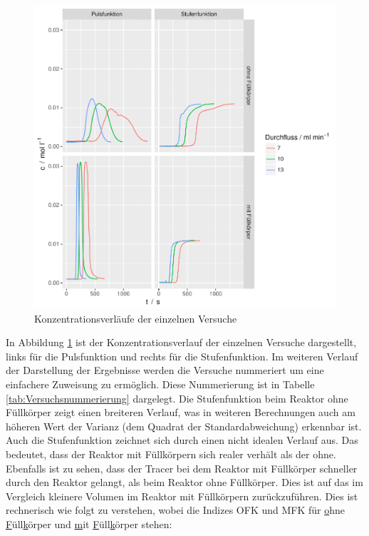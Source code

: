 \documentclass[12pt,liststotoc]{report}
\begin{document}
\begin{figure}[H]
\centering
\includegraphics[width=1\textwidth]{Graphics/ct.pdf}
\caption[Konzentrationsverläufe]{Konzentrationsverläufe der einzelnen Versuche}
\label{konzentrationsverlauf}
\end{figure}
\noindent
In Abbildung \ref{konzentrationsverlauf} ist der Konzentrationsverlauf der einzelnen Versuche dargestellt, links für die Pulsfunktion und rechts für die Stufenfunktion. Im weiteren Verlauf der Darstellung der Ergebnisse werden die Versuche nummeriert um eine einfachere Zuweisung zu ermöglich. Diese Nummerierung ist in Tabelle \ref{tab:Versuchsnummerierung} dargelegt. Die Stufenfunktion beim Reaktor ohne Füllkörper zeigt einen breiteren Verlauf, was in weiteren Berechnungen auch am höheren Wert der Varianz (dem Quadrat der Standardabweichung) erkennbar ist. Auch die Stufenfunktion zeichnet sich durch einen nicht idealen Verlauf aus. Das bedeutet, dass der Reaktor mit Füllkörpern sich realer verhält als der ohne. Ebenfalls ist zu sehen, dass der Tracer bei dem Reaktor mit Füllkörper schneller durch den Reaktor gelangt, als beim Reaktor  ohne Füllkörper. Dies ist auf das im Vergleich kleinere Volumen im Reaktor mit Füllkörpern zurückzuführen. Dies ist rechnerisch wie folgt zu verstehen, wobei die Indizes OFK und MFK  für \underline{o}hne \underline{F}üll\underline{k}örper und \underline{m}it \underline{F}üll\underline{k}örper stehen:
\end{document}
